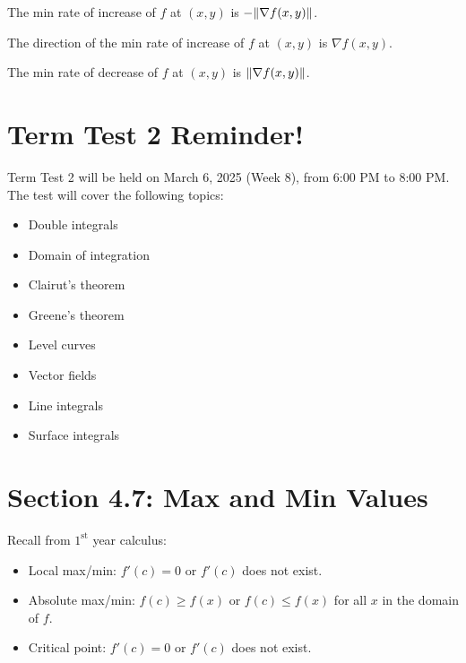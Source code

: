\documentclass{article}
\begin{document}
The min rate of increase of \( f \) at \( (x, y) \) is \( -\norm{\nabla f(x, y)} \).

The direction of the min rate of increase of \( f \) at \( (x, y) \) is \( \nabla f(x, y) \).

\begin{definitionbox}
    The min rate of decrease of \( f \) at \( (x, y) \) is \( \norm{\nabla f(x, y)} \).
\end{definitionbox}

\cleardoublepage
{}


\normalsize

\setcounter{page}{1}

\section*{Term Test 2 Reminder!}

\begin{notebox}
    Term Test 2 will be held on March 6, 2025 (Week 8), from 6:00 PM to 8:00 PM. The test will cover the following topics:
    \begin{itemize}
        \item Double integrals
        \item Domain of integration
        \item Clairut's theorem
        \item Greene's theorem
        \item Level curves
        \item Vector fields
        \item Line integrals
        \item Surface integrals
    \end{itemize}
\end{notebox}

\section*{Section 4.7: Max and Min Values}

Recall from $1^{\text{st}}$ year calculus:
\begin{itemize}
    \item Local max/min: \( f'(c) = 0 \) or \( f'(c) \) does not exist.
    \item Absolute max/min: \( f(c) \geq f(x) \) or \( f(c) \leq f(x) \) for all \( x \) in the domain of \( f \).
    \item Critical point: \( f'(c) = 0 \) or \( f'(c) \) does not exist.
\end{itemize}
\end{document}
